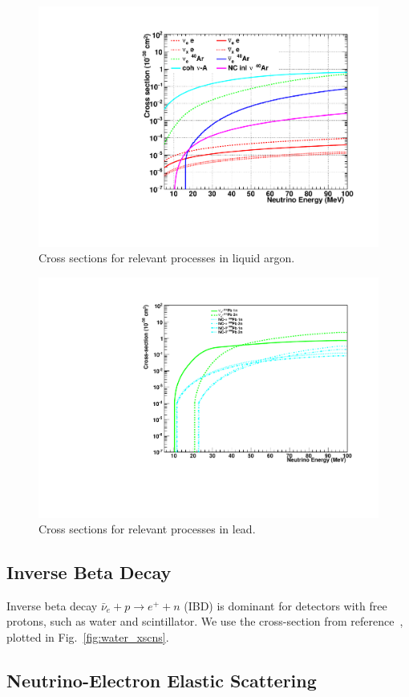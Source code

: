 \documentclass[12pt]{article}
\begin{document}
\begin{figure}[htb]
  \centering\includegraphics[width=.75\textwidth]{figures/xscns_argon.pdf}
  \caption{Cross sections for relevant processes in liquid argon.}
  \label{fig:argon_xscns}
\end{figure}

\begin{figure}[htb]
  \centering\includegraphics[width=.75\textwidth]{figures/xscns_lead.pdf}
  \caption{Cross sections for relevant processes in lead.}
  \label{fig:lead_xscns}
\end{figure}


\subsection{Inverse Beta Decay}

Inverse beta decay $\bar{\nu}_e+ p \rightarrow e^+ + n$ (IBD) is
dominant for detectors with free protons, such as water and
scintillator.  We use the cross-section from reference~\cite{strumia:2003zx},
plotted in Fig.~\ref{fig:water_xscns}.


\subsection{Neutrino-Electron Elastic Scattering}
\end{document}
